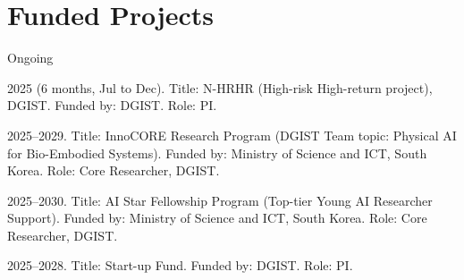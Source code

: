 \section{Funded Projects}

\vspace{1mm}
\begin{pubSubsectionNum}{Ongoing}
    \item 2025 (6 months, Jul to Dec). Title: N-HRHR (High-risk High-return project), DGIST. Funded by: DGIST. Role: PI.
    \vspace{-1mm}
    \item 2025--2029. Title: InnoCORE Research Program (DGIST Team topic: Physical AI for Bio-Embodied Systems). Funded by: Ministry of Science and ICT, South Korea. Role: Core Researcher, DGIST.
    \vspace{-1mm}
    \item 2025--2030. Title: AI Star Fellowship Program (Top-tier Young AI Researcher Support). Funded by: Ministry of Science and ICT, South Korea. Role: Core Researcher, DGIST.
    \vspace{-1mm}
    \item 2025--2028. Title: Start-up Fund. Funded by: DGIST. Role: PI.
    \vspace{-1mm}
\end{pubSubsectionNum}


